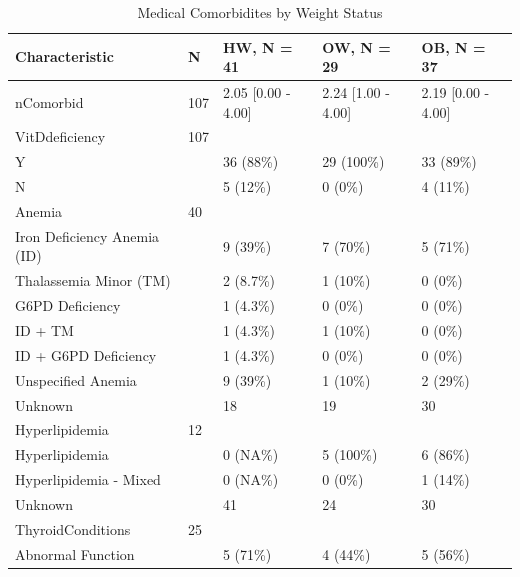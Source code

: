 \documentclass[
]{article}
\begin{document}
\begin{table}[!h]

\caption{\label{tab:Med_OB_tab}Medical Comorbidites by Weight Status}
\centering
\begin{tabular}[t]{lllll}
\toprule
Characteristic & N & HW, N = 41 & OW, N = 29 & OB, N = 37\\
\midrule
nComorbid & 107 & 2.05 [0.00 - 4.00] & 2.24 [1.00 - 4.00] & 2.19 [0.00 - 4.00]\\
VitDdeficiency & 107 &  &  & \\
\hspace{1em}Y &  & 36 (88\%) & 29 (100\%) & 33 (89\%)\\
\hspace{1em}N &  & 5 (12\%) & 0 (0\%) & 4 (11\%)\\
Anemia & 40 &  &  & \\
\addlinespace
\hspace{1em}Iron Deficiency Anemia (ID) &  & 9 (39\%) & 7 (70\%) & 5 (71\%)\\
\hspace{1em}Thalassemia Minor (TM) &  & 2 (8.7\%) & 1 (10\%) & 0 (0\%)\\
\hspace{1em}G6PD Deficiency &  & 1 (4.3\%) & 0 (0\%) & 0 (0\%)\\
\hspace{1em}ID + TM &  & 1 (4.3\%) & 1 (10\%) & 0 (0\%)\\
\hspace{1em}ID + G6PD Deficiency &  & 1 (4.3\%) & 0 (0\%) & 0 (0\%)\\
\addlinespace
\hspace{1em}Unspecified Anemia &  & 9 (39\%) & 1 (10\%) & 2 (29\%)\\
\hspace{1em}Unknown &  & 18 & 19 & 30\\
Hyperlipidemia & 12 &  &  & \\
\hspace{1em}Hyperlipidemia &  & 0 (NA\%) & 5 (100\%) & 6 (86\%)\\
\hspace{1em}Hyperlipidemia - Mixed &  & 0 (NA\%) & 0 (0\%) & 1 (14\%)\\
\addlinespace
\hspace{1em}Unknown &  & 41 & 24 & 30\\
ThyroidConditions & 25 &  &  & \\
\hspace{1em}Abnormal Function &  & 5 (71\%) & 4 (44\%) & 5 (56\%)\\

\end{tabular}
\end{table}
\end{document}

